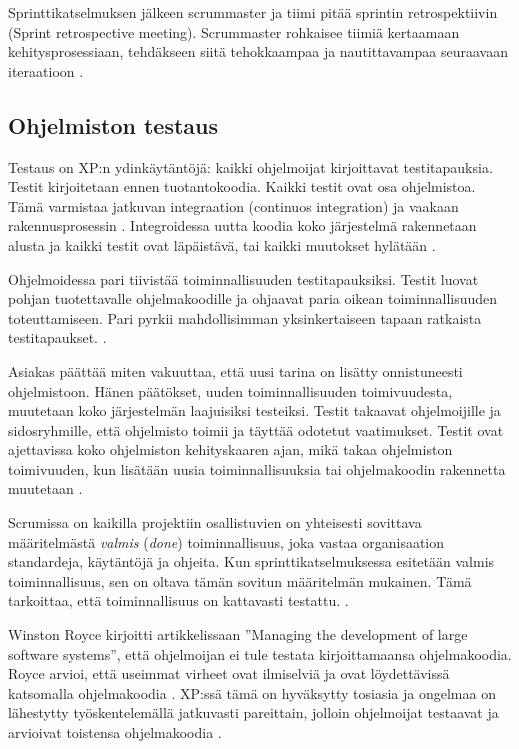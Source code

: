 \documentclass[finnish]{tktltiki2}
\theoremstyle{definition}
\theoremstyle{remark}
\begin{document}
{Sprinttikatselmuksen jälkeen scrummaster ja tiimi pitää sprintin retrospektiivin (Sprint retrospective meeting). Scrummaster rohkaisee tiimiä kertaamaan kehitysprosessiaan, tehdäkseen siitä tehokkaampaa ja nautittavampaa seuraavaan iteraatioon \cite{SCH09}.

\subsection{Ohjelmiston testaus}

Testaus on XP:n ydinkäytäntöjä: kaikki ohjelmoijat kirjoittavat testitapauksia. Testit kirjoitetaan ennen tuotantokoodia. Kaikki testit ovat osa ohjelmistoa. Tämä varmistaa jatkuvan integraation (continuos integration) ja vaakaan rakennusprosessin \cite{FOW01a}. Integroidessa uutta koodia koko järjestelmä rakennetaan alusta ja kaikki testit ovat läpäistävä, tai kaikki muutokset hylätään \cite{BEC99}.

Ohjelmoidessa pari tiivistää toiminnallisuuden testitapauksiksi. Testit luovat pohjan tuotettavalle ohjelmakoodille ja ohjaavat paria oikean toiminnallisuuden toteuttamiseen. Pari pyrkii mahdollisimman yksinkertaiseen tapaan ratkaista testitapaukset. \cite{BEC99}.

Asiakas päättää miten vakuuttaa, että uusi tarina on lisätty onnistuneesti ohjelmistoon. Hänen päätökset, uuden toiminnallisuuden toimivuudesta, muutetaan koko järjestelmän laajuisiksi testeiksi. Testit takaavat ohjelmoijille ja sidosryhmille, että ohjelmisto toimii ja täyttää odotetut vaatimukset. Testit ovat ajettavissa koko ohjelmiston kehityskaaren ajan, mikä takaa ohjelmiston toimivuuden, kun lisätään uusia toiminnallisuuksia tai ohjelmakoodin rakennetta muutetaan \cite{BEC99}.

Scrumissa on kaikilla projektiin osallistuvien on yhteisesti sovittava määritelmästä \textit{valmis} (\textit{done}) toiminnallisuus, joka vastaa organisaation standardeja, käytäntöjä ja ohjeita. Kun sprinttikatselmuksessa esitetään valmis toiminnallisuus, sen on oltava tämän sovitun määritelmän mukainen. Tämä tarkoittaa, että toiminnallisuus on kattavasti testattu. \cite{SCH09}.

Winston Royce kirjoitti artikkelissaan ''Managing the development of large software systems'', että ohjelmoijan ei tule testata kirjoittamaansa ohjelmakoodia. Royce arvioi, että useimmat virheet ovat ilmiselviä ja ovat löydettävissä katsomalla ohjelmakoodia \cite{ROY70}. XP:ssä tämä on hyväksytty tosiasia ja ongelmaa on lähestytty työskentelemällä jatkuvasti pareittain, jolloin ohjelmoijat testaavat ja arvioivat toistensa ohjelmakoodia \cite{BEC99}.

}
\end{document}

